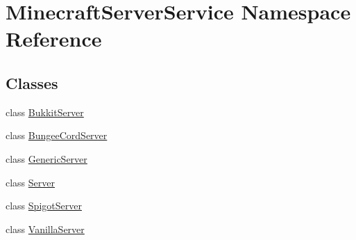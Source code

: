 \hypertarget{namespace_minecraft_server_service}{}\section{Minecraft\+Server\+Service Namespace Reference}
\label{namespace_minecraft_server_service}
\subsection*{Classes}
\begin{DoxyCompactItemize}
\item 
class \hyperlink{class_minecraft_server_service_1_1_bukkit_server}{Bukkit\+Server}
\item 
class \hyperlink{class_minecraft_server_service_1_1_bungee_cord_server}{Bungee\+Cord\+Server}
\item 
class \hyperlink{class_minecraft_server_service_1_1_generic_server}{Generic\+Server}
\item 
class \hyperlink{class_minecraft_server_service_1_1_server}{Server}
\item 
class \hyperlink{class_minecraft_server_service_1_1_spigot_server}{Spigot\+Server}
\item 
class \hyperlink{class_minecraft_server_service_1_1_vanilla_server}{Vanilla\+Server}
\end{DoxyCompactItemize}
